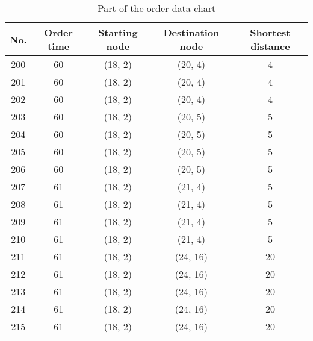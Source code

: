 \begin{Appendix}
    \begin{table}[H]
        \centering
        \caption{Part of the order data chart}
        \label{table.OrderChart}
        \begin{tabular}{ccccc}
            \toprule
            \textbf{No.}    &   \textbf{Order time} &   \textbf{Starting node}  &   \textbf{Destination node}   &   \textbf{Shortest distance}   \\
            \midrule
            200             &   60                  &    (18, 2)                 &   (20, 4)    &   4   \\
            201             &   60                  &    (18, 2)                 &   (20, 4)    &   4   \\
            202             &   60                  &    (18, 2)                 &   (20, 4)    &   4   \\
            203             &   60                  &    (18, 2)                 &   (20, 5)    &   5   \\
            204             &   60                  &    (18, 2)                 &   (20, 5)    &   5   \\
            205             &   60                  &    (18, 2)                 &   (20, 5)    &   5   \\
            206             &   60                  &    (18, 2)                 &   (20, 5)    &   5   \\
            207             &   61                  &    (18, 2)                 &   (21, 4)    &   5   \\
            208             &   61                  &    (18, 2)                 &   (21, 4)    &   5   \\
            209             &   61                  &    (18, 2)                 &   (21, 4)    &   5   \\
            210             &   61                  &    (18, 2)                 &   (21, 4)    &   5   \\
            211             &   61                  &    (18, 2)                 &   (24, 16)   &   20  \\
            212             &   61                  &    (18, 2)                 &   (24, 16)   &   20  \\
            213             &   61                  &    (18, 2)                 &   (24, 16)   &   20  \\
            214             &   61                  &    (18, 2)                 &   (24, 16)   &   20  \\
            215             &   61                  &    (18, 2)                 &   (24, 16)   &   20  \\
            \bottomrule
        \end{tabular}
    \end{table}


\end{Appendix}
